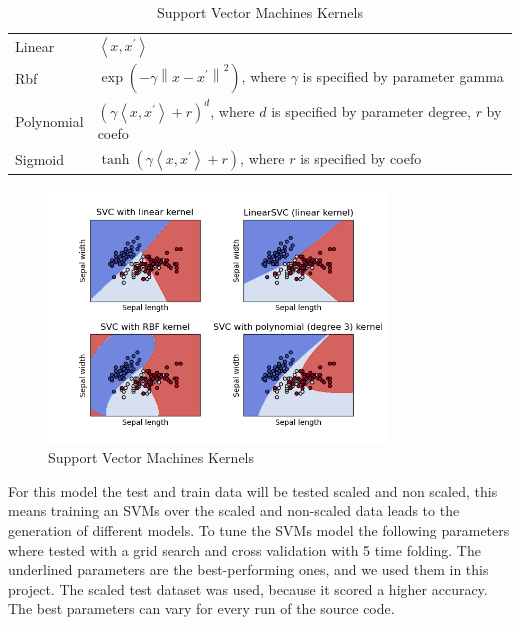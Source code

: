 \documentclass[11pt]{article}
\begin{document}
	\begin{minipage}[b]{0.5\linewidth}
		\begin{table}[H]
			\begin{tabularx}{\textwidth}{lX}
				Linear & $\left\langle x, x^{\prime}\right\rangle$\\
				Rbf &  $\exp \left(-\gamma\left\|x-x^{\prime}\right\|^{2}\right)$, where $\gamma$ is specified by parameter gamma \\
				Polynomial & $ \left(\gamma\left\langle x, x^{\prime}\right\rangle+r\right)^{d}$, where $d$ is specified by parameter degree, $r$ by coefo  \\
				Sigmoid & $\tanh \left(\gamma\left\langle x, x^{\prime}\right\rangle+r\right)$, where $r$ is specified by coefo \\
			\end{tabularx}
			\caption{Support Vector Machines Kernels}
			\label{tab:svmsKernels}
		\end{table}
	\end{minipage}
	\begin{minipage}[b]{0.5\linewidth}
			\begin{figure}[H]
			\centering
			\includegraphics[width=0.8\textwidth]{img/svms}
			\caption{Support Vector Machines Kernels \cite{scikit}}
			\label{fig:svms}
		\end{figure}
	\end{minipage}
	For this model the test and train data will be tested scaled and non scaled, this means training an SVMs over the scaled and non-scaled data leads to the generation of different models. To tune the SVMs model the following parameters where tested with a grid search and cross validation with 5 time folding. The underlined parameters are the best-performing ones, and we used them in this project. The scaled test dataset was used, because it scored a higher accuracy. The best parameters can vary for every run of the source code.
\end{document}
